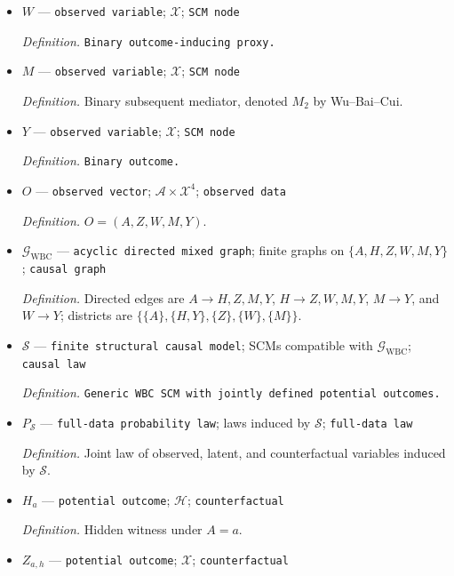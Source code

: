\documentclass{article}
\begin{document}
\begin{itemize}
  \par\smallskip\noindent\emph{Definition.} \texttt{Binary treatment-\allowbreak{}inducing proxy.}
  \item \(W\) --- \texttt{observed variable}; \(\mathcal X\); \texttt{SCM node}
  \par\smallskip\noindent\emph{Definition.} \texttt{Binary outcome-\allowbreak{}inducing proxy.}
  \item \(M\) --- \texttt{observed variable}; \(\mathcal X\); \texttt{SCM node}
  \par\smallskip\noindent\emph{Definition.} Binary subsequent mediator, denoted \(M_2\) by Wu--Bai--Cui.
  \item \(Y\) --- \texttt{observed variable}; \(\mathcal X\); \texttt{SCM node}
  \par\smallskip\noindent\emph{Definition.} \texttt{Binary outcome.}
  \item \(O\) --- \texttt{observed vector}; \(\mathcal A\times\mathcal X^4\); \texttt{observed data}
  \par\smallskip\noindent\emph{Definition.} \(O=(A,Z,W,M,Y)\).
  \item \(\mathcal G_{\mathrm{WBC}}\) --- \texttt{acyclic directed mixed graph}; finite graphs on \(\{A,H,Z,W,M,Y\}\); \texttt{causal graph}
  \par\smallskip\noindent\emph{Definition.} Directed edges are \(A\to H,Z,M,Y\), \(H\to Z,W,M,Y\), \(M\to Y\), and \(W\to Y\); districts are \(\{\{A\},\{H,Y\},\{Z\},\{W\},\{M\}\}\).
  \item \(\mathcal S\) --- \texttt{finite structural causal model}; SCMs compatible with \(\mathcal G_{\mathrm{WBC}}\); \texttt{causal law}
  \par\smallskip\noindent\emph{Definition.} \texttt{Generic WBC SCM with jointly defined potential outcomes.}
  \item \(P_{\mathcal S}\) --- \texttt{full-\allowbreak{}data probability law}; laws induced by \(\mathcal S\); \texttt{full-\allowbreak{}data law}
  \par\smallskip\noindent\emph{Definition.} Joint law of observed, latent, and counterfactual variables induced by \(\mathcal S\).
  \item \(H_a\) --- \texttt{potential outcome}; \(\mathcal H\); \texttt{counterfactual}
  \par\smallskip\noindent\emph{Definition.} Hidden witness under \(A=a\).
  \item \(Z_{a,h}\) --- \texttt{potential outcome}; \(\mathcal X\); \texttt{counterfactual}

\end{itemize}
\end{document}
